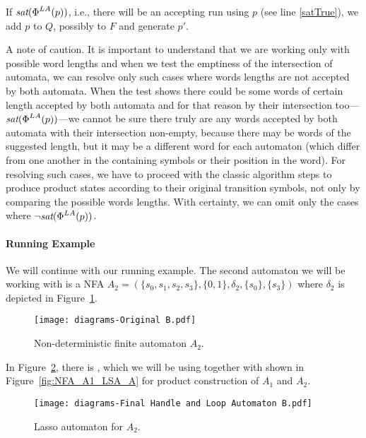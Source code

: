 If $\emph{sat}(\emph{$\Phi$}^{LA}(p))$, i.e., there will be an accepting run using $p$ (see line \ref{satTrue}), we add $p$ to $Q$, possibly to $F$ and generate $p'$.

A note of caution. It is important to understand that we are working only with possible word lengths and when we test the emptiness of the intersection of automata, we can resolve only such cases where words lengths are not accepted by both automata. When the test shows there could be some words of certain length accepted by both automata and for that reason by their intersection too---$\emph{sat}(\emph{$\Phi$}^{LA}(p))$---we cannot be sure there truly are any words accepted by both automata with their intersection non-empty, because there may be words of the suggested length, but it may be a different word for each automaton (which differ from one another in the containing symbols or their position in the word). For resolving such cases, we have to proceed with the classic algorithm steps to produce product states according to their original transition symbols, not only by comparing the possible words lengths. With certainty, we can omit only the cases where $\neg \emph{sat}(\emph{$\Phi$}^{LA}(p))$.

\paragraph{Running Example}

We will continue with our running example. The second automaton we will be working with is a NFA $A_2 = (\{s_0, s_1, s_2, s_3\}, \{0, 1\}, \delta_2, \{s_0\}, \{s_3\}) $ where $\delta_2$ is depicted in Figure~\ref{fig:NFA_A2_orig}.

\begin{figure}[ht]
    \centering
	\texttt{[image: diagrams-Original B.pdf]}
	\caption{Non-deterministic finite automaton $A_2$.}
	\label{fig:NFA_A2_orig}
\end{figure}

In Figure~\ref{fig:HaL_A2}, there is , which we will be using together with  shown in Figure~\ref{fig:NFA_A1_LSA_A} for product construction of $A_1$ and $A_2$.

\begin{figure}[ht]
    \centering
	\texttt{[image: diagrams-Final Handle and Loop Automaton B.pdf]}
	\caption{Lasso automaton  for $A_2$.}
	\label{fig:HaL_A2}
\end{figure}

